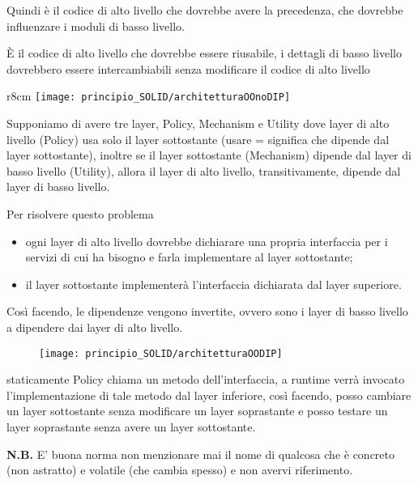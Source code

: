 Quindi è il codice di alto livello che dovrebbe avere la precedenza, che dovrebbe influenzare i moduli di basso livello.

È il codice di alto livello che dovrebbe essere riusabile, i dettagli di basso livello dovrebbero essere intercambiabili senza 
modificare il codice di alto livello
\smallskip

\begin{wrapfigure}{r}{8cm}
  \texttt{[image: principio\_SOLID/architetturaOOnoDIP]}  
\end{wrapfigure}
Supponiamo di avere tre layer, Policy, Mechanism e Utility dove layer di alto livello (Policy) usa solo il layer sottostante
(usare = significa che dipende dal layer sottostante), inoltre se il layer sottostante (Mechanism) dipende dal layer di basso livello (Utility), allora il layer di alto 
livello, transitivamente, dipende dal layer di basso livello.

Per risolvere questo problema
\begin{itemize}
  \item ogni layer di alto livello dovrebbe dichiarare una propria interfaccia per i servizi di cui ha bisogno e farla implementare al layer sottostante;
  \item il layer sottostante implementerà l'interfaccia dichiarata dal layer superiore.
\end{itemize}

Così facendo, le dipendenze vengono invertite, ovvero sono i layer di basso livello a dipendere dai layer di alto livello.
\begin{figure}[H]
  \centering
  \texttt{[image: principio\_SOLID/architetturaOODIP]}  
\end{figure}

staticamente Policy chiama un metodo dell'interfaccia, a runtime verrà invocato l'implementazione di tale metodo dal layer inferiore, così facendo, posso cambiare un
layer sottostante senza modificare un layer soprastante e posso testare un layer soprastante senza avere un layer sottostante. 
\medskip

\textbf{N.B.} E' buona norma non menzionare mai il nome di qualcosa che è concreto (non astratto) e volatile (che cambia spesso) e non avervi riferimento.